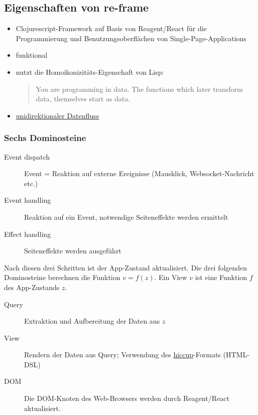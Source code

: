 \documentclass[a4paper]{article}
\begin{document}
\subsection*{Eigenschaften von re-frame}
\label{sec:org5352780}
\begin{itemize}
\item Clojurescript-Framework auf Basis von Reagent/React für die
Programmierung und Benutzungsoberflächen von Single-Page-Applications
\item funktional
\item nutzt die Homoikonizitäts-Eigenschaft von Lisp:
\begin{quote}
You are programming in data. The functions which later transform
data, themselves start as data.
\end{quote}
\item \hyperref[sec:org3e38e09]{unidirektionaler Datenfluss}
\end{itemize}
\subsubsection*{Sechs Dominosteine}
\label{sec:org702b141}
\begin{description}
\item[{Event dispatch}] Event = Reaktion auf externe Ereignisse (Mausklick,
Websocket-Nachricht etc.)
\item[{Event handling}] Reaktion auf ein Event, notwendige Seiteneffekte werden ermittelt
\item[{Effect handling}] Seiteneffekte werden ausgeführt
\end{description}
Nach diesen drei Schritten ist der App-Zustand aktualisiert.
Die drei folgenden Dominosteine berechnen die Funktion \(v = f(z)\). Ein
View \(v\) ist eine Funktion \(f\) des App-Zustands \(z\).
\begin{description}
\item[{Query}] Extraktion und Aufbereitung der Daten aus \(z\)
\item[{View}] Rendern der Daten aus Query; Verwendung des \href{https://github.com/weavejester/hiccup}{hiccup}-Formats (HTML-DSL)
\item[{DOM}] Die DOM-Knoten des Web-Browsers werden durch Reagent/React
aktualisiert.
\end{description}
\end{document}

